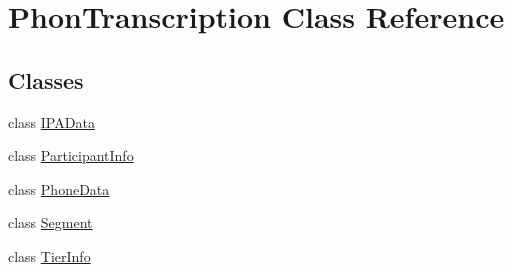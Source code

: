 \hypertarget{class_phon_transcription}{}\section{Phon\+Transcription Class Reference}
\label{class_phon_transcription}
\subsection*{Classes}
\begin{DoxyCompactItemize}
\item 
class \hyperlink{class_phon_transcription_1_1_i_p_a_data}{I\+P\+A\+Data}
\item 
class \hyperlink{class_phon_transcription_1_1_participant_info}{Participant\+Info}
\item 
class \hyperlink{class_phon_transcription_1_1_phone_data}{Phone\+Data}
\item 
class \hyperlink{class_phon_transcription_1_1_segment}{Segment}
\item 
class \hyperlink{class_phon_transcription_1_1_tier_info}{Tier\+Info}
\end{DoxyCompactItemize}

